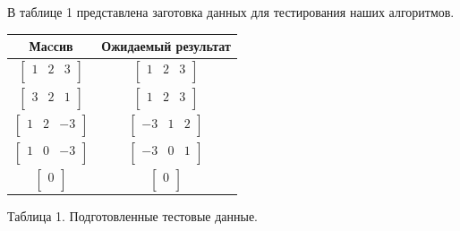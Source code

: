 \documentclass[a4paper,14pt]{article} %
\begin{document}
	В таблице 1 представлена заготовка данных для тестирования наших алгоритмов. 
	\begin{center}
		\begin{tabular}{  | c | c | }
			\hline
			\textbf{Маcсив}& \textbf{Ожидаемый результат} \\ \hline
			$\begin{bmatrix} 
   			1&2&3 \\
			\end{bmatrix}$ & 
			$\begin{bmatrix} 
   			1&2&3 \\
			\end{bmatrix}$ \\
			\hline
			
			$\begin{bmatrix} 
   			3&2&1 \\
			\end{bmatrix}$ & 
			$\begin{bmatrix} 
   			1&2&3 \\
			\end{bmatrix}$ \\
			\hline
			
			$\begin{bmatrix} 
   			1&2&-3 \\
			\end{bmatrix}$ & 
			$\begin{bmatrix} 
   			-3&1&2 \\
			\end{bmatrix}$ \\
			\hline
			
			$\begin{bmatrix} 
   			1&0&-3 \\
			\end{bmatrix}$ & 
			$\begin{bmatrix} 
   			-3&0&1 \\
			\end{bmatrix}$ \\
			\hline
			
			$\begin{bmatrix} 
   			0 \\
			\end{bmatrix}$ & 
			$\begin{bmatrix} 
   			0 \\
			\end{bmatrix}$ \\
			\hline
		\end{tabular}
		
		\hfill
		
		Таблица 1.
		Подготовленные тестовые данные.  
	\end{center}
\end{document}
